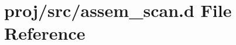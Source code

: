 \hypertarget{assem__scan_8d}{}\section{proj/src/assem\+\_\+scan.d File Reference}
\label{assem__scan_8d}
